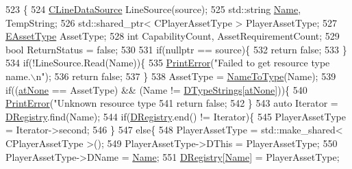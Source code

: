 \begin{DoxyCode}
523                                                               \{
524     \hyperlink{classCLineDataSource}{CLineDataSource} LineSource(source);
525     std::string \hyperlink{classCPlayerAssetType_afd1b77119e34b459918551a08012ed35}{Name}, TempString;
526     std::shared\_ptr< CPlayerAssetType > PlayerAssetType;
527     \hyperlink{GameDataTypes_8h_a5600d4fc433b83300308921974477fec}{EAssetType} AssetType;
528     \textcolor{keywordtype}{int} CapabilityCount, AssetRequirementCount;
529     \textcolor{keywordtype}{bool} ReturnStatus = \textcolor{keyword}{false};
530     
531     \textcolor{keywordflow}{if}(\textcolor{keyword}{nullptr} == source)\{
532         \textcolor{keywordflow}{return} \textcolor{keyword}{false};   
533     \}
534     \textcolor{keywordflow}{if}(!LineSource.Read(Name))\{
535         \hyperlink{Debug_8h_a2ed825eefefe35baf59a93a8c641323d}{PrintError}(\textcolor{stringliteral}{"Failed to get resource type name.\(\backslash\)n"});
536         \textcolor{keywordflow}{return} \textcolor{keyword}{false};
537     \}
538     AssetType = \hyperlink{classCPlayerAssetType_a42d55b6d7606e021c063fce3a14c56de}{NameToType}(Name);
539     \textcolor{keywordflow}{if}((\hyperlink{GameDataTypes_8h_a5600d4fc433b83300308921974477feca82fb51718e2c00981a2d37bc6fe92593}{atNone} == AssetType) && (Name != \hyperlink{classCPlayerAssetType_a1f87f6f8c42b692a500c875e9359a438}{DTypeStrings}[\hyperlink{GameDataTypes_8h_a5600d4fc433b83300308921974477feca82fb51718e2c00981a2d37bc6fe92593}{atNone}]))\{
540         \hyperlink{Debug_8h_a2ed825eefefe35baf59a93a8c641323d}{PrintError}(\textcolor{stringliteral}{"Unknown resource type %
541         \textcolor{keywordflow}{return} \textcolor{keyword}{false};
542     \}
543     \textcolor{keyword}{auto} Iterator = \hyperlink{classCPlayerAssetType_a24f4ccd06fbddacc936e31a2f1f12ed5}{DRegistry}.find(Name);
544     \textcolor{keywordflow}{if}(\hyperlink{classCPlayerAssetType_a24f4ccd06fbddacc936e31a2f1f12ed5}{DRegistry}.end() != Iterator)\{
545         PlayerAssetType = Iterator->second;
546     \}
547     \textcolor{keywordflow}{else}\{
548         PlayerAssetType = std::make\_shared< CPlayerAssetType >();
549         PlayerAssetType->DThis = PlayerAssetType;
550         PlayerAssetType->DName = \hyperlink{classCPlayerAssetType_afd1b77119e34b459918551a08012ed35}{Name};
551         \hyperlink{classCPlayerAssetType_a24f4ccd06fbddacc936e31a2f1f12ed5}{DRegistry}[\hyperlink{classCPlayerAssetType_afd1b77119e34b459918551a08012ed35}{Name}] = PlayerAssetType;
}
\end{DoxyCode}
